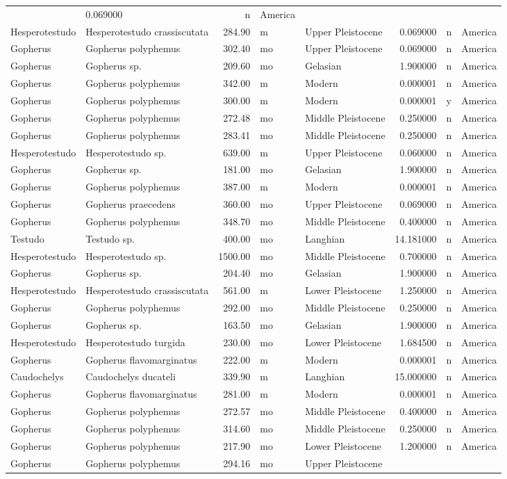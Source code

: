 \documentclass[]{article}
\begin{document}
\begin{longtable}[]{@{}llrllrll@{}}
& 0.069000 & n & America\tabularnewline
Hesperotestudo & Hesperotestudo crassiscutata & 284.90 & m & Upper
Pleistocene & 0.069000 & n & America\tabularnewline
Gopherus & Gopherus polyphemus & 302.40 & mo & Upper Pleistocene &
0.069000 & n & America\tabularnewline
Gopherus & Gopherus sp. & 209.60 & mo & Gelasian & 1.900000 & n &
America\tabularnewline
Gopherus & Gopherus polyphemus & 342.00 & m & Modern & 0.000001 & n &
America\tabularnewline
Gopherus & Gopherus polyphemus & 300.00 & m & Modern & 0.000001 & y &
America\tabularnewline
Gopherus & Gopherus polyphemus & 272.48 & mo & Middle Pleistocene &
0.250000 & n & America\tabularnewline
Gopherus & Gopherus polyphemus & 283.41 & mo & Middle Pleistocene &
0.250000 & n & America\tabularnewline
Hesperotestudo & Hesperotestudo sp. & 639.00 & m & Upper Pleistocene &
0.060000 & n & America\tabularnewline
Gopherus & Gopherus sp. & 181.00 & mo & Gelasian & 1.900000 & n &
America\tabularnewline
Gopherus & Gopherus polyphemus & 387.00 & m & Modern & 0.000001 & n &
America\tabularnewline
Gopherus & Gopherus praecedens & 360.00 & mo & Upper Pleistocene &
0.069000 & n & America\tabularnewline
Gopherus & Gopherus polyphemus & 348.70 & mo & Middle Pleistocene &
0.400000 & n & America\tabularnewline
Testudo & Testudo sp. & 400.00 & mo & Langhian & 14.181000 & n &
America\tabularnewline
Hesperotestudo & Hesperotestudo sp. & 1500.00 & mo & Middle Pleistocene
& 0.700000 & n & America\tabularnewline
Gopherus & Gopherus sp. & 204.40 & mo & Gelasian & 1.900000 & n &
America\tabularnewline
Hesperotestudo & Hesperotestudo crassiscutata & 561.00 & m & Lower
Pleistocene & 1.250000 & n & America\tabularnewline
Gopherus & Gopherus polyphemus & 292.00 & mo & Middle Pleistocene &
0.250000 & n & America\tabularnewline
Gopherus & Gopherus sp. & 163.50 & mo & Gelasian & 1.900000 & n &
America\tabularnewline
Hesperotestudo & Hesperotestudo turgida & 230.00 & mo & Lower
Pleistocene & 1.684500 & n & America\tabularnewline
Gopherus & Gopherus flavomarginatus & 222.00 & m & Modern & 0.000001 & n
& America\tabularnewline
Caudochelys & Caudochelys ducateli & 339.90 & m & Langhian & 15.000000 &
n & America\tabularnewline
Gopherus & Gopherus flavomarginatus & 281.00 & m & Modern & 0.000001 & n
& America\tabularnewline
Gopherus & Gopherus polyphemus & 272.57 & mo & Middle Pleistocene &
0.400000 & n & America\tabularnewline
Gopherus & Gopherus polyphemus & 314.60 & mo & Middle Pleistocene &
0.250000 & n & America\tabularnewline
Gopherus & Gopherus polyphemus & 217.90 & mo & Lower Pleistocene &
1.200000 & n & America\tabularnewline
Gopherus & Gopherus polyphemus & 294.16 & mo & Upper Pleistocene &

\end{longtable}
\end{document}
